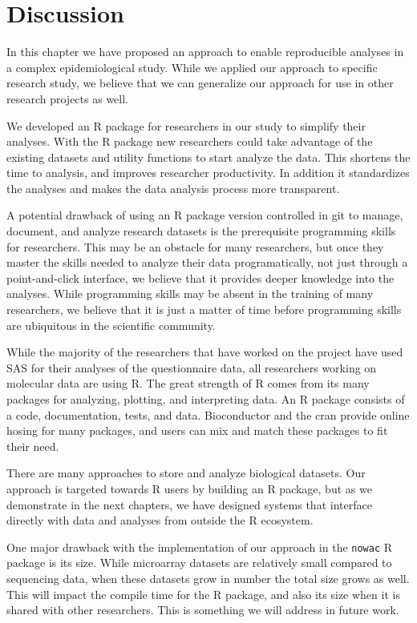 \section{Discussion}
In this chapter we have proposed an approach to enable reproducible analyses in
a complex epidemiological study. While we applied our approach to specific
research study, we believe that we can generalize our approach for use in other
research projects as well. 

We developed an R package for researchers in our study to simplify their
analyses. With the R package new researchers could take advantage of the
existing datasets and utility functions to start analyze the data. This shortens
the time to analysis, and improves researcher productivity. In addition it
standardizes the analyses and makes the data analysis process more transparent. 

A potential drawback of using an R package version controlled in git to manage,
document, and analyze research datasets is the prerequisite programming
skills for researchers. This may be an obstacle for many researchers, but
once they master the skills needed to analyze their data programatically, not
just through a point-and-click interface, we believe that it provides deeper
knowledge into the analyses. While programming skills may be absent in the
training of many researchers, we believe that it is just a matter of time before
programming skills are ubiquitous in the scientific community. 

While the majority of the researchers that have worked on the project have used
SAS for their analyses of the questionnaire data, all researchers working on
molecular data are using R.  The great strength of R comes from its many
packages for analyzing, plotting, and interpreting data. An R package consists
of a code, documentation, tests, and data.  Bioconductor\cite{bioconductor} and
the \gls{cran}\cite{cran} provide online hosing for many packages, and users can
mix and match these packages to fit their need. 

There are many approaches to store and analyze biological datasets. Our approach
is targeted towards R users by building an R package, but as we demonstrate in
the next chapters, we have designed systems that interface directly with data
and analyses from outside the R ecosystem. 

One major drawback with the implementation of our approach in the \texttt{nowac}
R package is its size. While microarray datasets are relatively small compared
to sequencing data, when these datasets grow in number the total size grows as
well. This will impact the compile time for the R package, and also its size
when it is shared with other researchers. This is something we will address
in future work. 

